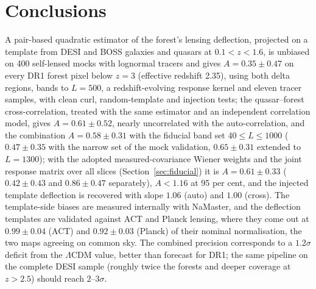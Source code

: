 \documentclass[11pt,a4paper]{article}
\begin{document}
\section{Conclusions}
A pair-based quadratic estimator of the forest's lensing deflection, projected on a template from DESI and BOSS galaxies and quasars at $0.1<z<1.6$, is unbiased on 400 self-lensed mocks with lognormal tracers and gives $A=0.35\pm0.47$ on every DR1 forest pixel below $z=3$ (effective redshift 2.35), using both delta regions, bands to $L=500$, a redshift-evolving response kernel and eleven tracer samples, with clean curl, random-template and injection tests; the quasar--forest cross-correlation, treated with the same estimator and an independent correlation model, gives $A=0.61\pm0.52$, nearly uncorrelated with the auto-correlation, and the combination $A=0.58\pm0.31$ with the fiducial band set $40\le L\le1000$ ($0.47\pm0.35$ with the narrow set of the mock validation, $0.65\pm0.31$ extended to $L=1300$); with the adopted measured-covariance Wiener weights and the joint response matrix over all slices (Section~\ref{sec:fiducial}) it is $A=0.61\pm0.33$ ($0.42\pm0.43$ and $0.86\pm0.47$ separately), $A<1.16$ at 95 per cent, and the injected template deflection is recovered with slope $1.06$ (auto) and $1.00$ (cross). The template-side biases are measured internally with NaMaster, and the deflection templates are validated against ACT and Planck lensing, where they come out at $0.99\pm0.04$ (ACT) and $0.92\pm0.03$ (Planck) of their nominal normalisation, the two maps agreeing on common sky. The combined precision corresponds to a $1.2\sigma$ deficit from the $\Lambda$CDM value, better than forecast for DR1; the same pipeline on the complete DESI sample (roughly twice the forests and deeper coverage at $z>2.5$) should reach $2$--$3\sigma$.



\end{document}
